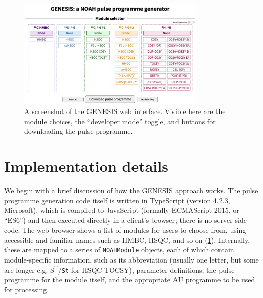 \documentclass[a4paper,11pt]{article}
\begin{document}
\begin{figure}
    \centering
    \includegraphics[width=0.8\textwidth]{screenshot.png}
    \caption{
        A screenshot of the GENESIS web interface.
        Visible here are the module choices, the ``developer mode'' toggle, and buttons for downloading the pulse programme.
    }
    \label{fig:screenshot}
\end{figure}

\section{Implementation details}

We begin with a brief discussion of how the GENESIS approach works.
The pulse programme generation code itself is written in TypeScript (version 4.2.3, Microsoft), which is compiled to JavaScript (formally ECMAScript 2015, or ``ES6'') and then executed directly in a client's browser; there is no server-side code.
The web browser shows a list of modules for users to choose from, using accessible and familiar names such as HMBC, HSQC, and so on (\cref{fig:screenshot}).
Internally, these are mapped to a series of \texttt{NOAHModule} objects, each of which contain module-specific information, such as its abbreviation (usually one letter, but some are longer e.g. $\mathrm{S^T}$/\texttt{St} for HSQC-TOCSY), parameter definitions, the pulse programme for the module itself, and the appropriate AU programme to be used for processing. 
\end{document}
